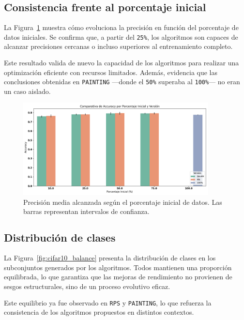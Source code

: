 \subsection{Consistencia frente al porcentaje inicial}

La Figura~\ref{fig:cifar10_porcentaje} muestra cómo evoluciona la precisión en función del porcentaje de datos iniciales. Se confirma que, a partir del \texttt{25\%}, los algoritmos son capaces de alcanzar precisiones cercanas o incluso superiores al entrenamiento completo.

Este resultado valida de nuevo la capacidad de los algoritmos para realizar una optimización eficiente con recursos limitados. Además, evidencia que las conclusiones obtenidas en \texttt{PAINTING} —donde el \texttt{50\%} superaba al \texttt{100\%}— no eran un caso aislado.

\begin{figure}[htp]
    \centering
    \includegraphics[width=0.9\textwidth]{imagenes/evaluaciones/cifar10/comparacion_por_porcentaje.png}
    \caption{Precisión media alcanzada según el porcentaje inicial de datos. Las barras representan intervalos de confianza.}
    \label{fig:cifar10_porcentaje}
\end{figure}

\subsection{Distribución de clases}

La Figura~\ref{fig:cifar10_balance} presenta la distribución de clases en los subconjuntos generados por los algoritmos. Todos mantienen una proporción equilibrada, lo que garantiza que las mejoras de rendimiento no provienen de sesgos estructurales, sino de un proceso evolutivo eficaz.

Este equilibrio ya fue observado en \texttt{RPS} y \texttt{PAINTING}, lo que refuerza la consistencia de los algoritmos propuestos en distintos contextos.

